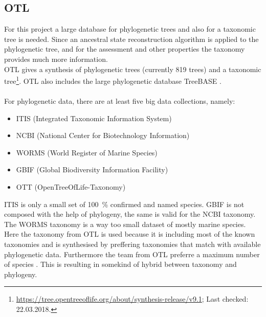     \subsection{OTL}
      For this project a large database for phylogenetic trees and also for a taxonomic tree is needed. 
        Since an ancestral state reconstruction algorithm is applied to the phylogenetic tree, and for 
        the assessment and other properties the taxonomy provides much more information. \\
      OTL gives a synthesis of phylogenetic trees (currently 819 trees) and a taxonomic tree\footnote{
          \hyperlink{https://tree.opentreeoflife.org/about/synthesis-release/v9.1}
          {https://tree.opentreeoflife.org/about/synthesis-release/v9.1}; Last checked: 22.03.2018.
        }. OTL also 
        includes the large phylogenetic database TreeBASE \cite{Hinchliff2015}. \\
       \\
      For phylogenetic data, there are at least five big data collections, namely:
      \begin{itemize}
        \item ITIS (Integrated Taxonomic Information System) \cite{ITIS}
        \item NCBI (National Center for Biotechnology Information) \cite{NCBI1988}
        \item WORMS (World Register of Marine Species) \cite{WoRMS2018}
        \item GBIF (Global Biodiversity Information Facility) \cite{GBIF}
        \item OTT (OpenTreeOfLife-Taxonomy) \cite{Hinchliff2015}
      \end{itemize}
      ITIS is only a small set of 100~\% confirmed and named species. GBIF is not composed with the help 
        of phylogeny, the same is valid for the NCBI taxonomy. The WORMS taxonomy is a way too small 
        dataset of mostly marine species. \\
      Here the taxonomy from OTL is used because it is including most of the known taxonomies and is 
        synthesised by preffering taxonomies that match with available phylogenetic data. Furthermore 
        the team from OTL preferre a maximum number of species \cite{Hinchliff2015}. This is resulting 
        in somekind of hybrid between taxonomy and phylogeny.  \\

